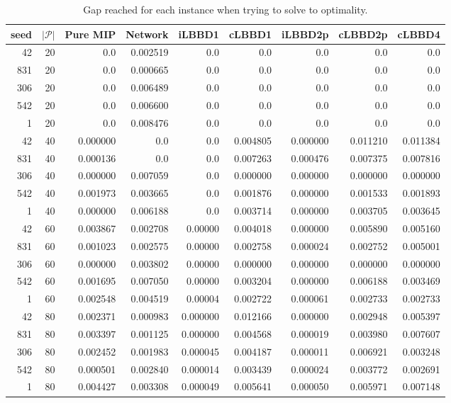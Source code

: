 \begin{table*}
    \centering
    \caption{Gap reached for each instance when trying to solve to optimality.}
    \begin{tabular}{rrrrrrrrr} \toprule
        seed & $|\mathcal{P}|$ & Pure MIP & Network & iLBBD1 & cLBBD1 & iLBBD2p & cLBBD2p & cLBBD4 \\\midrule
        42     &       20 & 0.0 &0.002519&    0.0  &   0.0   &   0.0   &   0.0   &   0.0 \\
        831      &      20 & 0.0 &0.000665&    0.0  &   0.0  &    0.0   &   0.0   &   0.0\\
        306      &      20 & 0.0 &0.006489&    0.0  &   0.0  &    0.0   &   0.0   &   0.0\\
        542      &      20  &0.0 &0.006600&    0.0  &   0.0  &    0.0  &    0.0   &   0.0\\
        1       &     20 & 0.0   &0.008476&  0.0  &   0.0   &   0.0   &   0.0   &   0.0\\\midrule
       42       &     40&  0.000000 &0.0&    0.0&  0.004805&  0.000000 & 0.011210 & 0.011384\\
       831      &      40 & 0.000136 &0.0&    0.0&  0.007263 & 0.000476&  0.007375&  0.007816\\
        306     &       40 & 0.000000 &0.007059&    0.0&  0.000000&  0.000000 & 0.000000&  0.000000\\
       542      &      40&  0.001973  &0.003665&   0.0&  0.001876  &0.000000 & 0.001533 & 0.001893\\
         1      &      40 & 0.000000  &0.006188&   0.0 & 0.003714 & 0.000000 & 0.003705 & 0.003645\\\midrule
        42       &     60&  0.003867&0.002708&  0.00000&  0.004018 & 0.000000 & 0.005890 & 0.005160 \\
        831      &      60&  0.001023&0.002575&  0.00000&  0.002758&  0.000024&  0.002752&  0.005001\\
        306      &      60&  0.000000&0.003802&  0.00000&  0.000000&  0.000000&  0.000000 & 0.000000\\
        542      &      60 & 0.001695&0.007050&  0.00000&  0.003204&  0.000000&  0.006188 & 0.003469\\
        1        &    60 & 0.002548&0.004519&  0.00004&  0.002722 & 0.000061 & 0.002733 & 0.002733\\\midrule
        42       &     80 & 0.002371 & 0.000983 & 0.000000  &0.012166 & 0.000000  &0.002948  &0.005397\\
        831      &      80 & 0.003397 & 0.001125  &0.000000 & 0.004568 & 0.000019 & 0.003980 & 0.007607\\
        306      &      80 & 0.002452 & 0.001983 & 0.000045 & 0.004187 & 0.000011 & 0.006921 & 0.003248\\
        542      &      80 & 0.000501 & 0.002840 & 0.000014 & 0.003439 & 0.000024 & 0.003772 & 0.002691\\
        1        &    80 & 0.004427 & 0.003308 & 0.000049 & 0.005641 & 0.000050 & 0.005971 & 0.007148\\

      \bottomrule
    \end{tabular}
\end{table*}
